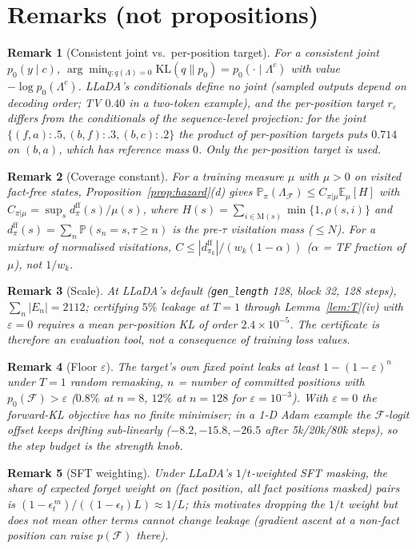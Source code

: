 \documentclass[11pt]{article}
\newtheorem{remark}{Remark}
\newcommand{\F}{\mathcal{F}}
\newcommand{\E}{\mathbb{E}}
\newcommand{\Prob}{\mathbb{P}}
\newcommand{\KL}{\mathrm{KL}}
\newcommand{\M}{\mathrm{M}}
\begin{document}
\section{Remarks (not propositions)}
\begin{remark}[Consistent joint vs.\ per-position target]
For a consistent joint $p_0(y\mid c)$, $\arg\min_{q:q(\Lambda)=0}\KL(q\|p_0)=p_0(\cdot\mid\Lambda^c)$ with value $-\log p_0(\Lambda^c)$.
LLaDA's conditionals define no joint (sampled outputs depend on decoding order; TV $0.40$ in a two-token example), and the
per-position target $r_\varepsilon$ differs from the conditionals of the sequence-level projection: for the joint
$\{(f,a):.5,(b,f):.3,(b,c):.2\}$ the product of per-position targets puts $0.714$ on $(b,a)$, which has reference mass $0$.
Only the per-position target is used.
\end{remark}
\begin{remark}[Coverage constant]
For a training measure $\mu$ with $\mu>0$ on visited fact-free states, Proposition~\ref{prop:hazard}(d) gives
$\Prob_\pi(\Lambda_\F)\le C_{\pi|\mu}\E_\mu[H]$ with $C_{\pi|\mu}=\sup_s d^{\mathrm{ff}}_\pi(s)/\mu(s)$, where $H(s)=\sum_{i\in\M(s)}\min\{1,\rho(s,i)\}$
and $d^{\mathrm{ff}}_\pi(s)=\sum_n\Prob(s_n=s,\tau\ge n)$ is the pre-$\tau$ visitation \emph{mass} ($\le N$). For a mixture of normalised visitations,
$C\le|d^{\mathrm{ff}}_{\pi_k}|/(w_k(1-\alpha))$ ($\alpha$ = TF fraction of $\mu$), not $1/w_k$.
\end{remark}
\begin{remark}[Scale]
At LLaDA's default (\texttt{gen\_length} 128, block 32, 128 steps), $\sum_n|E_n|=2112$; certifying $5\%$ leakage at $T=1$ through
Lemma~\ref{lem:T}(iv) with $\varepsilon=0$ requires a mean per-position KL of order $2.4\times10^{-5}$. The certificate is therefore an
evaluation tool, not a consequence of training loss values.
\end{remark}
\begin{remark}[Floor $\varepsilon$]
The target's own fixed point leaks at least $1-(1-\varepsilon)^{n}$ under $T=1$ random remasking, $n$ = number of committed positions
with $p_0(\F)>\varepsilon$ ($0.8\%$ at $n=8$, $12\%$ at $n=128$ for $\varepsilon=10^{-3}$). With $\varepsilon=0$ the forward-KL
objective has no finite minimiser; in a 1-D Adam example the $\F$-logit offset keeps drifting sub-linearly ($-8.2,-15.8,-26.5$
after 5k/20k/80k steps), so the step budget is the strength knob.
\end{remark}
\begin{remark}[SFT weighting]
Under LLaDA's $1/t$-weighted SFT masking, the share of expected forget weight on (fact position, all fact positions masked)
pairs is $(1-\epsilon_t^{\,m})/((1-\epsilon_t)L)\approx 1/L$; this motivates dropping the $1/t$ weight but does not mean other
terms cannot change leakage (gradient ascent at a non-fact position can raise $p(\F)$ there).
\end{remark}
\end{document}
